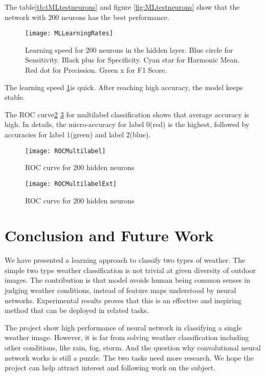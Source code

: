 The table\ref{tb:tMLtestneurons} and figure \ref{fig:MLtestneurons} show that the network with $200$ neurons has the best performance.

\begin{figure}[htb]
\centering
\texttt{[image: MLLearningRates]}
\caption{\label{fig:MLLearningRates}Learning speed for 200 neurons in the hidden layer. Blue circle for Sensitivity. Black plus for Specificity. Cyan star for Harmonic Mean. Red dot for Precission. Green x for  F1 Score.}
\end{figure}
The learning speed \ref{fig:MLLearningRates}is quick. After reaching high accuracy, the model keeps stable. 

The ROC curve\ref{fig:MLROCCurve} \ref{fig:MLROCCurveExt} for multilabel classification shows that average accuracy is high. In details, the micro-accuracy for label $0$(red) is the highest, followed by accuracies for label $1$(green) and label $2$(blue). 
\begin{figure}[htb]
\centering
\texttt{[image: ROCMultilabel]}
\caption{\label{fig:MLROCCurve}ROC curve for 200 hidden neurons}
\end{figure}

\begin{figure}[htb]
\centering
\texttt{[image: ROCMultilabelExt]}
\caption{\label{fig:MLROCCurveExt}ROC curve for 200 hidden neurons}
\end{figure}

\section{Conclusion and Future Work}

We have presented a learning approach to classify two types of weather. The simple two type weather classification is not trivial at given diversity of outdoor images. The contribution is that model avoids human being common senses in judging weather conditions, instead of feature maps understood by neural networks. Experimental results proves that this is an effective and inspiring method that can be deployed in related tasks.

The project show high performance of neural network in classifying a single weather image. However, it is far from solving weather classification including other conditions, like rain, fog, storm. And the question why convolutional neural network works is still a puzzle. The two tasks need more research. We hope the project can help attract interest and following work on the subject.
















